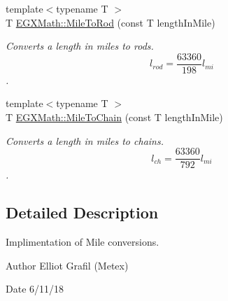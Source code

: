 \begin{DoxyCompactItemize}
{\footnotesize template$<$typename T $>$ }\\T \mbox{\hyperlink{group___e_g_x_math-_conversions-_length_conversions-_imperial-_mile-_surveyors_gae7e968004f761942f7d296ef66f1f93a}{E\+G\+X\+Math\+::\+Mile\+To\+Rod}} (const T length\+In\+Mile)
\begin{DoxyCompactList}\small\item\em Converts a length in miles to rods. \[ l_{rod}= \frac{63360}{198} l_{mi} \]. \end{DoxyCompactList}\item 
{\footnotesize template$<$typename T $>$ }\\T \mbox{\hyperlink{group___e_g_x_math-_conversions-_length_conversions-_imperial-_mile-_surveyors_gae3b09627ed639defe81e025bf827c8d7}{E\+G\+X\+Math\+::\+Mile\+To\+Chain}} (const T length\+In\+Mile)
\begin{DoxyCompactList}\small\item\em Converts a length in miles to chains. \[ l_{ch}= \frac{63360}{792} l_{mi} \]. \end{DoxyCompactList}\end{DoxyCompactItemize}


\subsection{Detailed Description}
Implimentation of Mile conversions. 

\begin{DoxyAuthor}{Author}
Elliot Grafil (Metex) 
\end{DoxyAuthor}
\begin{DoxyDate}{Date}
6/11/18 
\end{DoxyDate}
